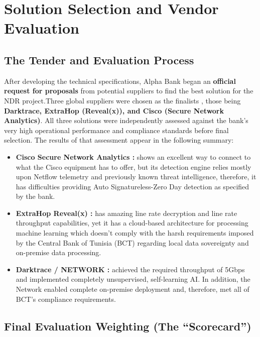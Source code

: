 \documentclass[12pt,a4paper]{report}
\begin{document}
\section{Solution Selection and Vendor Evaluation}

\subsection*{The Tender and Evaluation Process}

After developing the technical specifications, Alpha Bank began an \textbf{official request for proposals} from potential suppliers to find the best solution for the NDR project.Three global suppliers were chosen  as the finalists , those being \textbf{ Darktrace, ExtraHop (Reveal(x)), and Cisco (Secure Network Analytics)}. All three solutions were independently assessed against the bank's very high operational performance  and compliance standards before final selection. The results of that assessment appear in the following summary:

\begin{itemize}
    \item \textbf{Cisco Secure Network Analytics :} shows an excellent way to connect to what the Cisco equipment has to offer, but its detection engine relies mostly upon Netflow telemetry and previously known threat intelligence, therefore, it has difficulties providing Auto Signatureless-Zero Day detection as specified by the bank.

    \item \textbf{ExtraHop Reveal(x) :} has amazing line rate decryption and line rate throughput capabilities, yet it has a cloud-based architecture for processing machine learning which doesn't comply with the harsh requirements imposed by the Central Bank of Tunisia (BCT) regarding local data sovereignty and on-premise data processing.

    \item \textbf{Darktrace / NETWORK :} achieved the required throughput of 5Gbps and implemented completely unsupervised, self-learning AI. In addition, the Network enabled complete on-premise deployment and, therefore, met all of BCT’s compliance requirements.
\end{itemize}

\subsection{Final Evaluation Weighting (The ``Scorecard'')}
\end{document}
